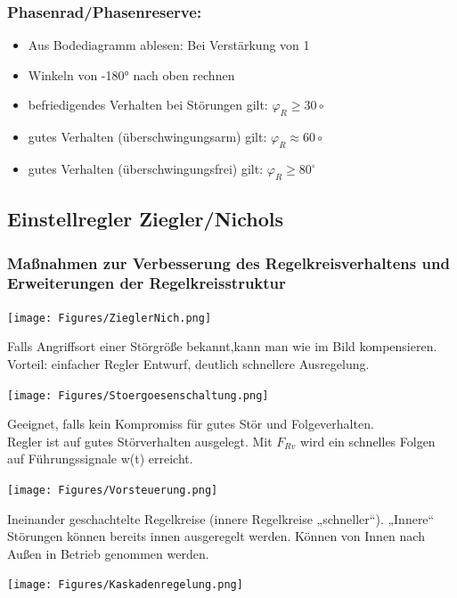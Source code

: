 \subsubsection{Phasenrad/Phasenreserve:}

\begin{itemize}[leftmargin=*]
	\item[] Aus Bodediagramm ablesen: Bei Verstärkung von 1
	\item[] Winkeln von -180° nach oben rechnen
	\item befriedigendes Verhalten bei Störungen gilt: $\varphi _R \geq 30\circ$
	\item gutes Verhalten (überschwingungsarm) gilt: $\varphi _R \approx  60\circ$
	\item gutes Verhalten (überschwingungsfrei) gilt: $\varphi _R \geq 80^\circ$
\end{itemize}

\subsection{Einstellregler Ziegler/Nichols}
\subsubsection{Maßnahmen zur Verbesserung des Regelkreisverhaltens und Erweiterungen der Regelkreisstruktur}

\centering
\texttt{[image: Figures/ZieglerNich.png]}\\

\raggedright
\begin{mdframed}[style=exercise, frametitle=Störgrößenaufschaltung:]
	Falls Angriffsort einer Störgröße bekannt,kann man wie im Bild kompensieren.\\
	Vorteil: einfacher Regler Entwurf, deutlich schnellere Ausregelung.
\end{mdframed}

\texttt{[image: Figures/Stoergoesenschaltung.png]}


\begin{mdframed}[style=exercise, frametitle=Vorsteuerung:]
	Geeignet, falls kein Kompromiss für gutes Stör und Folgeverhalten.\\
	Regler ist auf gutes Störverhalten ausgelegt. Mit $F_{Rv}$ wird ein schnelles Folgen
	auf Führungssignale w(t) erreicht.
\end{mdframed}

\texttt{[image: Figures/Vorsteuerung.png]}


\begin{mdframed}[style=exercise, frametitle=Kaskadenregelung:]
	Ineinander geschachtelte Regelkreise (innere Regelkreise „schneller“). „Innere“
	Störungen können bereits innen ausgeregelt werden. Können von Innen nach Außen in Betrieb genommen werden.
\end{mdframed}

\texttt{[image: Figures/Kaskadenregelung.png]}

\newpage